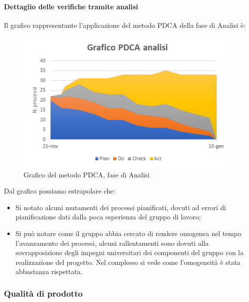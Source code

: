 \paragraph{Dettaglio delle verifiche tramite analisi} \Spazio
Il grafico rappresentante l'applicazione del metodo PDCA della fase di Analisi è:
\begin{figure} [H]
	\centering
	\includegraphics[scale=1]{Img/Grafico_PDCA}
	\caption{Grafico del metodo PDCA, fase di Analisi}\label{}
\end{figure}
Dal grafico possiamo estrapolare che:
\begin{itemize}
	\item Si notato alcuni mutamenti dei processi pianificati, dovuti ad errori di pianificazione dati dalla poca esperienza del gruppo di lavoro;
	\item Si può notare come il gruppo abbia cercato di rendere omogenea nel tempo l'avanzamento dei processi, alcuni rallentamenti sono dovuti alla sovrapposizione degli impegni
	universitari dei componenti del gruppo con la realizzazione del progetto. Nel complesso si vede come l'omogeneità è stata abbastanza rispettata.
\end{itemize}
\subsubsection{Qualità di prodotto}
